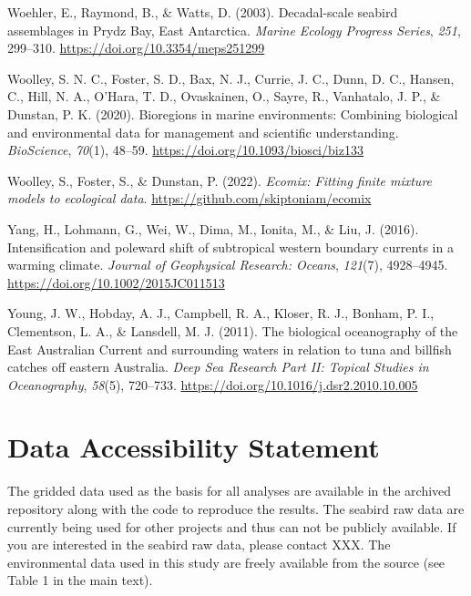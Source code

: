 \documentclass{article}
\newlength{\cslhangindent}
\newlength{\cslentryspacingunit} %
\newenvironment{CSLReferences}[2] %
 {%
  \setlength{\parindent}{0pt}
  \ifodd #1
  \let\oldpar\par
  \def\par{\hangindent=\cslhangindent\oldpar}
  \fi
  \setlength{\parskip}{#2\cslentryspacingunit}
 }%
 {}
\begin{document}
\begin{linenumbers}
\begin{CSLReferences}{1}{0}
\leavevmode{}%
Woehler, E., Raymond, B., \& Watts, D. (2003). Decadal-scale seabird assemblages in Prydz Bay, East Antarctica. \emph{Marine Ecology Progress Series}, \emph{251}, 299--310. \url{https://doi.org/10.3354/meps251299}

\leavevmode{}%
Woolley, S. N. C., Foster, S. D., Bax, N. J., Currie, J. C., Dunn, D. C., Hansen, C., Hill, N. A., O'Hara, T. D., Ovaskainen, O., Sayre, R., Vanhatalo, J. P., \& Dunstan, P. K. (2020). Bioregions in marine environments: Combining biological and environmental data for management and scientific understanding. \emph{BioScience}, \emph{70}(1), 48--59. \url{https://doi.org/10.1093/biosci/biz133}

\leavevmode{}%
Woolley, S., Foster, S., \& Dunstan, P. (2022). \emph{Ecomix: Fitting finite mixture models to ecological data}. \url{https://github.com/skiptoniam/ecomix}

\leavevmode{}%
Yang, H., Lohmann, G., Wei, W., Dima, M., Ionita, M., \& Liu, J. (2016). Intensification and poleward shift of subtropical western boundary currents in a warming climate. \emph{Journal of Geophysical Research: Oceans}, \emph{121}(7), 4928--4945. \url{https://doi.org/10.1002/2015JC011513}

\leavevmode{}%
Young, J. W., Hobday, A. J., Campbell, R. A., Kloser, R. J., Bonham, P. I., Clementson, L. A., \& Lansdell, M. J. (2011). The biological oceanography of the East Australian Current and surrounding waters in relation to tuna and billfish catches off eastern Australia. \emph{Deep Sea Research Part II: Topical Studies in Oceanography}, \emph{58}(5), 720--733. \url{https://doi.org/10.1016/j.dsr2.2010.10.005}

\end{CSLReferences}

\newpage

\hypertarget{data-accessibility-statement}{%
\section*{Data Accessibility Statement}\label{data-accessibility-statement}}

The gridded data used as the basis for all analyses are available in the archived repository along with the code to reproduce the results. The seabird raw data are currently being used for other projects and thus can not be publicly available. If you are interested in the seabird raw data, please contact XXX. The environmental data used in this study are freely available from the source (see Table 1 in the main text).


\end{linenumbers}
\end{document}
